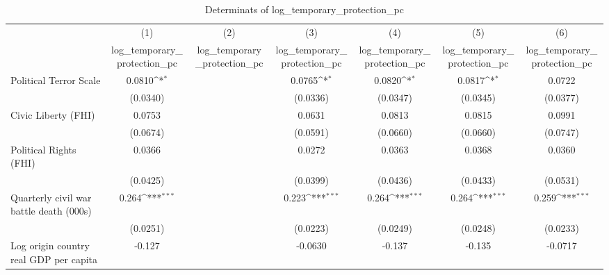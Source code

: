 \begin{table}[htbp]\centering
\def\sym#1{\ifmmode^{#1}\else\(^{#1}\)\fi}
\caption{Determinats of log\_temporary\_protection\_pc}
\begin{tabular}{l*{6}{c}}
\hline\hline
                    &\multicolumn{1}{c}{(1)}&\multicolumn{1}{c}{(2)}&\multicolumn{1}{c}{(3)}&\multicolumn{1}{c}{(4)}&\multicolumn{1}{c}{(5)}&\multicolumn{1}{c}{(6)}\\
                    &\multicolumn{1}{c}{log\_temporary\_protection\_pc}&\multicolumn{1}{c}{log\_temporary\_protection\_pc}&\multicolumn{1}{c}{log\_temporary\_protection\_pc}&\multicolumn{1}{c}{log\_temporary\_protection\_pc}&\multicolumn{1}{c}{log\_temporary\_protection\_pc}&\multicolumn{1}{c}{log\_temporary\_protection\_pc}\\
\hline
Political Terror Scale&      0.0810\sym{*}  &                     &      0.0765\sym{*}  &      0.0820\sym{*}  &      0.0817\sym{*}  &      0.0722         \\
                    &    (0.0340)         &                     &    (0.0336)         &    (0.0347)         &    (0.0345)         &    (0.0377)         \\
[1em]
Civic Liberty (FHI) &      0.0753         &                     &      0.0631         &      0.0813         &      0.0815         &      0.0991         \\
                    &    (0.0674)         &                     &    (0.0591)         &    (0.0660)         &    (0.0660)         &    (0.0747)         \\
[1em]
Political Rights (FHI)&      0.0366         &                     &      0.0272         &      0.0363         &      0.0368         &      0.0360         \\
                    &    (0.0425)         &                     &    (0.0399)         &    (0.0436)         &    (0.0433)         &    (0.0531)         \\
[1em]
Quarterly civil war battle death (000s)&       0.264\sym{***}&                     &       0.223\sym{***}&       0.264\sym{***}&       0.264\sym{***}&       0.259\sym{***}\\
                    &    (0.0251)         &                     &    (0.0223)         &    (0.0249)         &    (0.0248)         &    (0.0233)         \\
[1em]
Log origin country real GDP per capita&      -0.127         &                     &     -0.0630         &      -0.137         &      -0.135         &     -0.0717         \\

\end{tabular}
\end{table}
